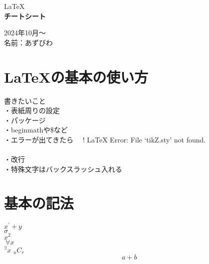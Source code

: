 \documentclass[11pt,a4j]{jreport}
\begin{document}

\thispagestyle{empty}
\begin{center}

\vspace{20mm}
{\Large\noindent LaTeX}\\
\vspace{40mm}
{\huge\noindent\textbf{チートシート}}\\
\medskip
\vspace{\baselineskip}
\vspace{30mm}

{\Large\noindent
2024年10月〜\\
\vspace{\baselineskip}
名前：あずびわ\\
}
\vspace{40mm}

\end{center}

\thispagestyle{empty}
\clearpage


\tableofcontents
\thispagestyle{fancy}
\pagestyle{fancy}
\lhead{\rightmark}
\renewcommand{\chaptermark}[1]{\markboth{第\ \normalfont\thechapter\ 章~~#1}{}}
\thispagestyle{fancy}
\chapter{LaTeXの基本の使い方}
書きたいこと\\
・表紙周りの設定\\
・パッケージ\\
・beginmathや\$など\\
・エラーが出てきたら　
! LaTeX Error: File `tikZ.sty' not found.\\
\\
・改行\\
・特殊文字はバックスラッシュ入れる\\

\chapter{基本の記法}
\thispagestyle{fancy}
$x^{\prime}+y$\\
$\sigma$\\
$x^{2}$\\
${}~{\forall}x$\\
${}^{\exists}x$
${}_{n}C_{r}$\\
\begin{equation}
a+b
\end{equation}
\end{document}
